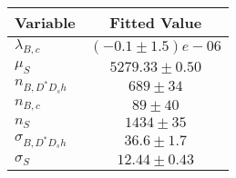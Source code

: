 \begin{tabular}[t]{lc}
\hline
Variable &Fitted Value\\
\hline\hline
$\lambda_{B,c}$&$(-0.1\pm1.5)e-06$\\
\hline
$\mu_S$&$5279.33\pm0.50$\\
\hline
$n_{B, D^* D_s h}$&$689\pm34$\\
\hline
$n_{B,c}$&$89\pm40$\\
\hline
$n_S$&$1434\pm35$\\
\hline
$\sigma_{B, D^* D_s h}$&$36.6\pm1.7$\\
\hline
$\sigma_S$&$12.44\pm0.43$\\
\hline
\end{tabular}